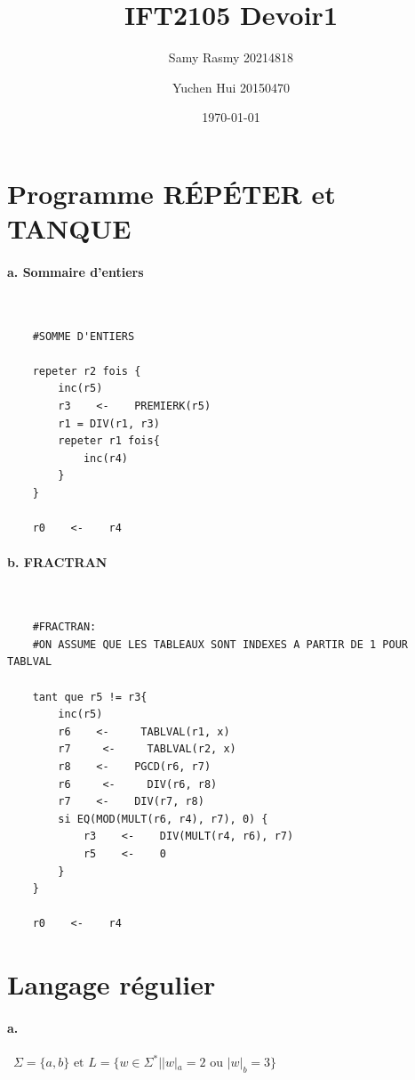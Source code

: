 \documentclass{article}
\title{\textbf{IFT2105 Devoir1}}
\author{
    Samy Rasmy 20214818 \and Yuchen Hui 20150470}
\date{\today}
\begin{document}
\maketitle
\newpage
\section{Programme RÉPÉTER et TANQUE}

\paragraph{a. Sommaire d'entiers}~{}\\

\begin{verbatim}
    #SOMME D'ENTIERS

    repeter r2 fois {
        inc(r5)
        r3    <-    PREMIERK(r5)
        r1 = DIV(r1, r3)
        repeter r1 fois{
            inc(r4)
        }
    }

    r0    <-    r4
\end{verbatim}

\paragraph{b. FRACTRAN}~{}\\
\begin{verbatim}
    #FRACTRAN:
    #ON ASSUME QUE LES TABLEAUX SONT INDEXES A PARTIR DE 1 POUR TABLVAL

    tant que r5 != r3{
        inc(r5)
        r6    <-     TABLVAL(r1, x)
        r7     <-     TABLVAL(r2, x)
        r8    <-    PGCD(r6, r7)
        r6     <-     DIV(r6, r8)
        r7    <-    DIV(r7, r8)
        si EQ(MOD(MULT(r6, r4), r7), 0) {
            r3    <-    DIV(MULT(r4, r6), r7)
            r5    <-    0
        }
    }

    r0    <-    r4
\end{verbatim}
\newpage
\section{Langage régulier}

\paragraph{a.}~$\Sigma = \{a,b\} \text{ et } L = \{w \in \Sigma^{*} | |w|_{a } = 2 \text{ ou } |w|_{b} = 3\}$ \\ 
\end{document}
